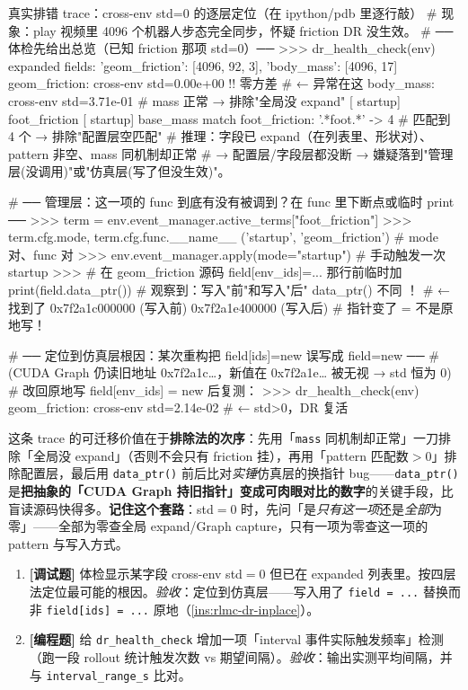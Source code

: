 \begin{codebox}[Python]{真实排错 trace：cross-env std=0 的逐层定位（在 ipython/pdb 里逐行敲）}
# 现象：play 视频里 4096 个机器人步态完全同步，怀疑 friction DR 没生效。
# ── 体检先给出总览（已知 friction 那项 std=0）──
>>> dr_health_check(env)
expanded fields: {'geom_friction': [4096, 92, 3], 'body_mass': [4096, 17]}
  geom_friction: cross-env std=0.00e+00   !! 零方差          # ← 异常在这
  body_mass:     cross-env std=3.71e-01                      # mass 正常 → 排除"全局没 expand"
  [ startup] foot_friction
  [ startup] base_mass
  match foot_friction: '.*foot.*' -> 4                       # 匹配到 4 个 → 排除"配置层空匹配"
# 推理：字段已 expand（在列表里、形状对）、pattern 非空、mass 同机制却正常
#       → 配置层/字段层都没断 → 嫌疑落到"管理层(没调用)"或"仿真层(写了但没生效)"。

# ── 管理层：这一项的 func 到底有没有被调到？在 func 里下断点或临时 print ──
>>> term = env.event_manager.active_terms["foot_friction"]
>>> term.cfg.mode, term.cfg.func.__name__
('startup', 'geom_friction')                                 # mode 对、func 对
>>> env.event_manager.apply(mode="startup")                  # 手动触发一次 startup
>>> # 在 geom_friction 源码 field[env_ids]=... 那行前临时加 print(field.data_ptr())
#    观察到：写入"前"和写入"后" data_ptr() 不同 ！                 # ← 找到了
0x7f2a1c000000   (写入前)
0x7f2a1e400000   (写入后)                                     # 指针变了 = 不是原地写！

# ── 定位到仿真层根因：某次重构把 field[ids]=new 误写成 field=new ──
#    (CUDA Graph 仍读旧地址 0x7f2a1c…，新值在 0x7f2a1e… 被无视 → std 恒为 0)
# 改回原地写 field[env_ids] = new 后复测：
>>> dr_health_check(env)
  geom_friction: cross-env std=2.14e-02                      # ← std>0，DR 复活
\end{codebox}

\noindent{}这条 trace 的可迁移价值在于\textbf{排除法的次序}：先用「\verb|mass| 同机制却正常」一刀排除「全局没 expand」（否则不会只有 friction 挂），再用「pattern 匹配数$>$0」排除配置层，最后用 \verb|data_ptr()| 前后比对\emph{实锤}仿真层的换指针 bug——\verb|data_ptr()| 是\textbf{把抽象的「CUDA Graph 持旧指针」变成可肉眼对比的数字}的关键手段，比盲读源码快得多。\textbf{记住这个套路}：std$=0$ 时，先问「是\emph{只有这一项}还是\emph{全部}为零」——全部为零查全局 expand/Graph capture，只有一项为零查这一项的 pattern 与写入方式。

\begin{practice}[本节练习]
\begin{enumerate}
  \item \textbf{[调试题]} 体检显示某字段 cross-env std$=0$ 但已在 expanded 列表里。按四层法定位最可能的根因。\emph{验收}：定位到仿真层——写入用了 \verb|field = ...| 替换而非 \verb|field[ids] = ...| 原地（\cref{ins:rlmc-dr-inplace}）。
  \item \textbf{[编程题]} 给 \verb|dr_health_check| 增加一项「interval 事件实际触发频率」检测（跑一段 rollout 统计触发次数 vs 期望间隔）。\emph{验收}：输出实测平均间隔，并与 \verb|interval_range_s| 比对。
\end{enumerate}
\end{practice}

